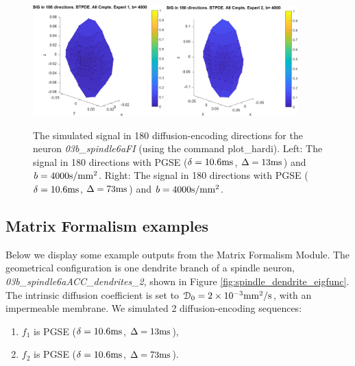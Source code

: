 \documentclass[a4paper]{article}
\begin{document}
\begin{figure}
    \centering
    \includegraphics[width=0.45\textwidth]{paper_neuron/03a_spindle6aFI_exp1b4000.jpg}
    \includegraphics[width=0.45\textwidth]{paper_neuron/03a_spindle6aFI_exp2b4000.jpg}
    \caption{The simulated signal in 180 diffusion-encoding directions for the neuron {\it 03b\_spindle6aFI} (using the command plot\_hardi). Left: The signal in 180 directions with PGSE ($\delta=10.6\mathrm{ms}$, $\Delta=13\mathrm{ms}$) and $b=4000\mathrm{s}/\text{mm}^2$. Right: The signal in 180 directions with PGSE ($\delta=10.6\mathrm{ms}$, $\Delta=73\mathrm{ms}$) and $b=4000\mathrm{s}/\text{mm}^2$.}
    \label{fig:sig_hardi_neuron}
\end{figure}



\subsection{Matrix Formalism examples}

Below we display some example outputs from the Matrix Formalism Module. The geometrical configuration is one dendrite branch of a spindle neuron, {\it 03b\_spindle6aACC\_dendrites\_2}, shown in Figure \ref{fig:spindle_dendrite_eigfunc}. The intrinsic diffusion coefficient is set to $\mathcal{D}_0 = 2\times 10^{-3} \mathrm{mm^2/s}$, with an impermeable membrane. We simulated 2 diffusion-encoding sequences:
\begin{enumerate}
    \item $f_1$ is PGSE ($\delta=10.6\mathrm{ms}$, $\Delta=13\mathrm{ms}$),
    \item $f_2$ is PGSE ($\delta=10.6\mathrm{ms}$, $\Delta=73\mathrm{ms}$).
\end{enumerate}
\end{document}
